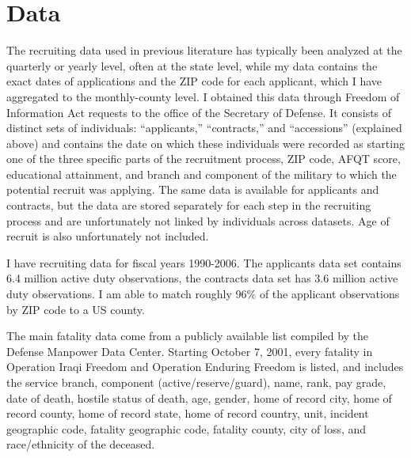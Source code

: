 \documentclass[12pt] {article}
\begin{document}

\section{Data\label{sec:Data}}

The recruiting data used in previous literature has typically been analyzed at the quarterly or yearly level, often at the state level, while my data contains the exact dates of applications and the ZIP code for each applicant, which I have aggregated to the monthly-county level. I obtained this data through Freedom
of Information Act requests to the office of the Secretary of Defense. It consists of distinct sets of individuals: {}``applicants,'' {}``contracts,''
and {}``accessions'' (explained above) and contains the date on which these individuals were recorded as starting one of the three
specific parts of the recruitment process, ZIP code, AFQT score, educational
attainment, and branch and component of the military to which the
potential recruit was applying. The same data is available for applicants
and contracts, but the data are stored separately for each step in
the recruiting process and are unfortunately not linked by individuals
across datasets. Age of recruit is also unfortunately not included.

I have recruiting data for fiscal years 1990-2006. The applicants data set
contains 6.4 million active duty observations, the contracts data
set has 3.6 million active duty observations. I am able to match roughly 96\% of the applicant observations by ZIP code to a US county.


The main fatality data come from a publicly available list compiled by the Defense Manpower Data Center. Starting October 7, 2001, every fatality in Operation Iraqi Freedom
and Operation Enduring Freedom is listed, and includes the service branch, component (active/reserve/guard), name, rank,
pay grade, date of death, hostile status of death, age, gender, home of record city, home of record county, home of record state, home
of record country, unit, incident geographic code, fatality geographic code, fatality county, city of loss, and race/ethnicity of the deceased.
\end{document}
